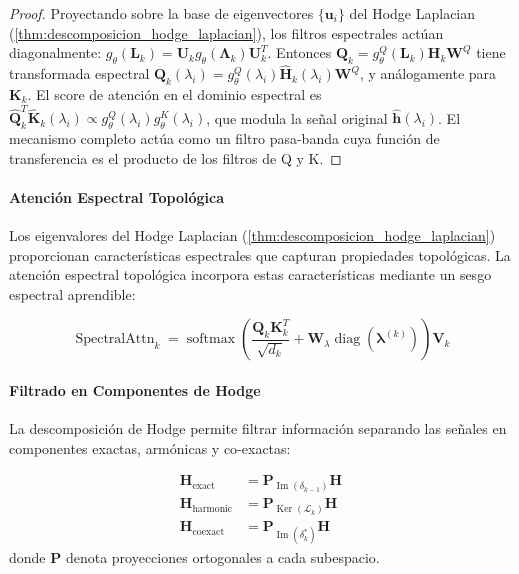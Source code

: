 \begin{proof}
Proyectando sobre la base de eigenvectores $\{\mathbf{u}_i\}$ del Hodge Laplacian (\autoref{thm:descomposicion_hodge_laplacian}), los filtros espectrales actúan diagonalmente: $g_\theta(\mathbf{L}_k) = \mathbf{U}_k g_\theta(\boldsymbol{\Lambda}_k) \mathbf{U}_k^T$. Entonces $\mathbf{Q}_k = g_\theta^Q(\mathbf{L}_k) \mathbf{H}_k \mathbf{W}^Q$ tiene transformada espectral $\hat{\mathbf{Q}}_k(\lambda_i) = g_\theta^Q(\lambda_i) \hat{\mathbf{H}}_k(\lambda_i) \mathbf{W}^Q$, y análogamente para $\mathbf{K}_k$. El score de atención en el dominio espectral es $\hat{\mathbf{Q}}_k^T \hat{\mathbf{K}}_k(\lambda_i) \propto g_\theta^Q(\lambda_i) g_\theta^K(\lambda_i)$, que modula la señal original $\hat{\mathbf{h}}(\lambda_i)$. El mecanismo completo actúa como un filtro pasa-banda cuya función de transferencia es el producto de los filtros de Q y K.
\end{proof}

\paragraph{Atención Espectral Topológica}

Los eigenvalores del Hodge Laplacian (\autoref{thm:descomposicion_hodge_laplacian}) proporcionan características espectrales que capturan propiedades topológicas. La atención espectral topológica incorpora estas características mediante un sesgo espectral aprendible:

\begin{equation}
\operatorname{SpectralAttn}_k = \operatorname{softmax}\left(\frac{\mathbf{Q}_k \mathbf{K}_k^T}{\sqrt{d_k}} + \mathbf{W}_{\lambda} \operatorname{diag}(\boldsymbol{\lambda}^{(k)})\right) \mathbf{V}_k
\label{eq:spectral_topological_attention}
\end{equation}

\paragraph{Filtrado en Componentes de Hodge}

La descomposición de Hodge permite filtrar información separando las señales en componentes exactas, armónicas y co-exactas:

\begin{align}
\mathbf{H}_{\text{exact}} &= \mathbf{P}_{\operatorname{Im}(\delta_{k-1})} \mathbf{H} \label{eq:exact_component} \\
\mathbf{H}_{\text{harmonic}} &= \mathbf{P}_{\operatorname{Ker}(\mathcal{L}_k)} \mathbf{H} \\
\mathbf{H}_{\text{coexact}} &= \mathbf{P}_{\operatorname{Im}(\delta_k^*)} \mathbf{H}
\end{align}
donde $\mathbf{P}$ denota proyecciones ortogonales a cada subespacio.

